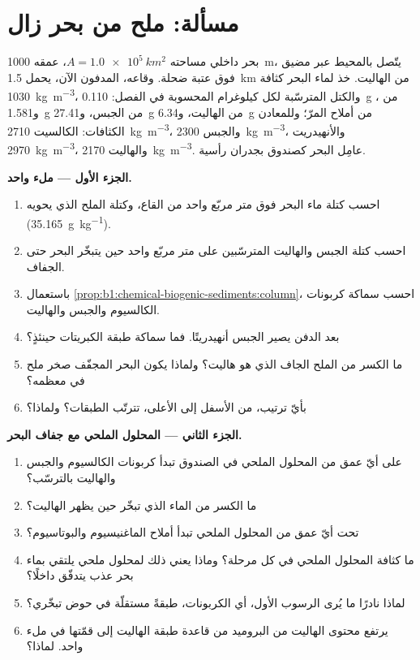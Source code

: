 \section{مسألة: ملح من بحر زال}

\begin{problem}
\label{pb:b1:chemical-biogenic-sediments:1}
بحر داخلي مساحته $A = \qty{1.0e5}{km^2}$، عمقه \qty{1000}{m}، يتّصل بالمحيط عبر مضيق فوق عتبة ضحلة. وقاعه، المدفون الآن، يحمل \qty{1.5}{km} من الهاليت. خذ لماء البحر كثافة \qty{1030}{kg.m^{-3}}، والكتل المترسّبة لكل كيلوغرام المحسوبة في الفصل: \qty{0.110}{g} من ، و\qty{1.581}{g} من الجبس، و\qty{27.41}{g} من الهاليت، و\qty{6.34}{g} من أملاح المرّ؛ وللمعادن الكثافات: الكالسيت \qty{2710}{kg.m^{-3}}، والجبس \qty{2300}{kg.m^{-3}}، والأنهيدريت \qty{2970}{kg.m^{-3}}، والهاليت \qty{2170}{kg.m^{-3}}. عامِل البحر كصندوق بجدران رأسية.

\medskip
\noindent\textbf{الجزء الأول --- ملء واحد.}
\begin{enumerate}
  \item احسب كتلة ماء البحر فوق متر مربّع واحد من القاع، وكتلة الملح الذي يحويه (\qty{35.165}{g.kg^{-1}}).
  \item احسب كتلة الجبس والهاليت المترسّبين على متر مربّع واحد حين يتبخّر البحر حتى الجفاف.
  \item باستعمال \cref{prop:b1:chemical-biogenic-sediments:column}، احسب سماكة كربونات الكالسيوم والجبس والهاليت.
  \item بعد الدفن يصير الجبس أنهيدريتًا. فما سماكة طبقة الكبريتات حينئذٍ؟
  \item ما الكسر من الملح الجاف الذي هو هاليت؟ ولماذا يكون البحر المجفّف صخر ملح في معظمه؟
  \item بأيّ ترتيب، من الأسفل إلى الأعلى، تترتّب الطبقات؟ ولماذا؟
\end{enumerate}

\noindent\textbf{الجزء الثاني --- المحلول الملحي مع جفاف البحر.}
\begin{enumerate}[resume]
  \item على أيّ عمق من المحلول الملحي في الصندوق تبدأ كربونات الكالسيوم والجبس والهاليت بالترسّب؟
  \item ما الكسر من الماء الذي تبخّر حين يظهر الهاليت؟
  \item تحت أيّ عمق من المحلول الملحي تبدأ أملاح الماغنيسيوم والبوتاسيوم؟
  \item ما كثافة المحلول الملحي في كل مرحلة؟ وماذا يعني ذلك لمحلول ملحي يلتقي بماء بحر عذب يتدفّق داخلًا؟
  \item لماذا نادرًا ما يُرى الرسوب الأول، أي الكربونات، طبقةً مستقلّة في حوض تبخّري؟
  \item يرتفع محتوى الهاليت من البروميد من قاعدة طبقة الهاليت إلى قمّتها في ملء واحد. لماذا؟
\end{enumerate}


\end{problem}
